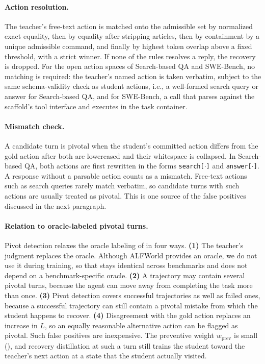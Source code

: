 \paragraph{Action resolution.} The teacher's free-text action is matched onto the admissible set by normalized exact equality, then by equality after stripping articles, then by containment by a unique admissible command, and finally by highest token overlap above a fixed threshold, with a strict winner. If none of the rules resolves a reply, the recovery is dropped. For the open action spaces of Search-based QA and SWE-Bench, no matching is required: the teacher's named action is taken verbatim, subject to the same schema-validity check as student actions, i.e., a well-formed search query or answer for Search-based QA, and for SWE-Bench, a call that parses against the scaffold's tool interface and executes in the task container.

\paragraph{Mismatch check.} A candidate turn is pivotal when the student's committed action differs from the gold action after both are lowercased and their whitespace is collapsed. In Search-based QA, both actions are first rewritten in the forms \texttt{search[$\cdot$]} and \texttt{answer[$\cdot$]}. A response without a parsable action counts as a mismatch. Free-text actions such as search queries rarely match verbatim, so candidate turns with such actions are usually treated as pivotal. This is one source of the false positives discussed in the next paragraph.

\paragraph{Relation to oracle-labeled pivotal turns.} Pivot detection relaxes the oracle labeling of  in four ways. \textbf{(1)} The teacher's judgment replaces the oracle. Although ALFWorld provides an oracle, we do not use it during training, so that \method{} stays identical across benchmarks and does not depend on a benchmark-specific oracle. \textbf{(2)} A trajectory may contain several pivotal turns, because the agent can move away from completing the task more than once. \textbf{(3)} Pivot detection covers successful trajectories as well as failed ones, because a successful trajectory can still contain a pivotal mistake from which the student happens to recover. \textbf{(4)} Disagreement with the gold action replaces an increase in $L$, so an equally reasonable alternative action can be flagged as pivotal. Such false positives are inexpensive. The preventive weight $w_\text{prev}$ is small (), and recovery distillation at such a turn still trains the student toward the teacher's next action at a state that the student actually visited.

